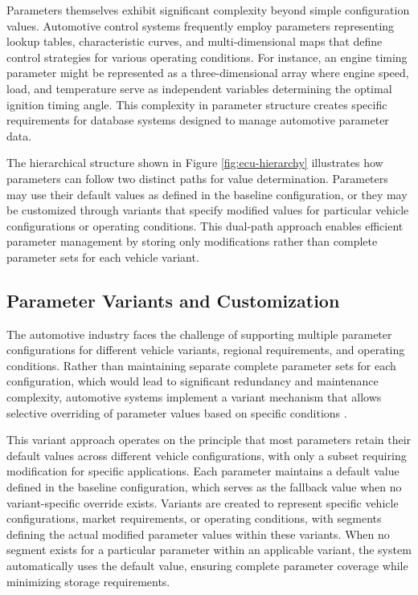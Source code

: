 Parameters themselves exhibit significant complexity beyond simple configuration values. Automotive control systems frequently employ parameters representing lookup tables, characteristic curves, and multi-dimensional maps that define control strategies for various operating conditions. For instance, an engine timing parameter might be represented as a three-dimensional array where engine speed, load, and temperature serve as independent variables determining the optimal ignition timing angle. This complexity in parameter structure creates specific requirements for database systems designed to manage automotive parameter data.

The hierarchical structure shown in Figure \ref{fig:ecu-hierarchy} illustrates how parameters can follow two distinct paths for value determination. Parameters may use their default values as defined in the baseline configuration, or they may be customized through variants that specify modified values for particular vehicle configurations or operating conditions. This dual-path approach enables efficient parameter management by storing only modifications rather than complete parameter sets for each vehicle variant.

\subsection{Parameter Variants and Customization}
\label{subsec:parameter-variants}

The automotive industry faces the challenge of supporting multiple parameter configurations for different vehicle variants, regional requirements, and operating conditions. Rather than maintaining separate complete parameter sets for each configuration, which would lead to significant redundancy and maintenance complexity, automotive systems implement a variant mechanism that allows selective overriding of parameter values based on specific conditions \cite{broy2006challenges}.

This variant approach operates on the principle that most parameters retain their default values across different vehicle configurations, with only a subset requiring modification for specific applications. Each parameter maintains a default value defined in the baseline configuration, which serves as the fallback value when no variant-specific override exists. Variants are created to represent specific vehicle configurations, market requirements, or operating conditions, with segments defining the actual modified parameter values within these variants. When no segment exists for a particular parameter within an applicable variant, the system automatically uses the default value, ensuring complete parameter coverage while minimizing storage requirements.

